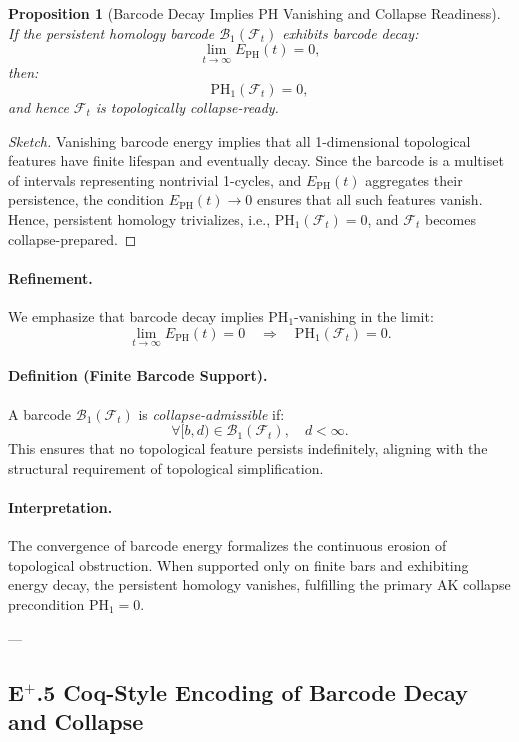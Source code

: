 \documentclass[11pt]{article}
\newtheorem{proposition}[theorem]{Proposition}
\begin{document}
\begin{proposition}[Barcode Decay Implies PH Vanishing and Collapse Readiness]
If the persistent homology barcode $\mathcal{B}_1(\mathcal{F}_t)$ exhibits barcode decay:
\[
\lim_{t \to \infty} E_{\mathrm{PH}}(t) = 0,
\]
then:
\[
\mathrm{PH}_1(\mathcal{F}_t) = 0,
\]
and hence $\mathcal{F}_t$ is topologically collapse-ready.
\end{proposition}

\begin{proof}[Sketch]
Vanishing barcode energy implies that all 1-dimensional topological features have finite lifespan and eventually decay. Since the barcode is a multiset of intervals representing nontrivial 1-cycles, and $E_{\mathrm{PH}}(t)$ aggregates their persistence, the condition $E_{\mathrm{PH}}(t) \to 0$ ensures that all such features vanish. Hence, persistent homology trivializes, i.e., $\mathrm{PH}_1(\mathcal{F}_t) = 0$, and $\mathcal{F}_t$ becomes collapse-prepared.
\end{proof}

\paragraph{Refinement.}
We emphasize that barcode decay implies PH$_1$-vanishing in the limit:
\[
\lim_{t \to \infty} E_{\mathrm{PH}}(t) = 0 \quad \Rightarrow \quad \mathrm{PH}_1(\mathcal{F}_t) = 0.
\]

\paragraph{Definition (Finite Barcode Support).}
A barcode $\mathcal{B}_1(\mathcal{F}_t)$ is \emph{collapse-admissible} if:
\[
\forall [b,d) \in \mathcal{B}_1(\mathcal{F}_t), \quad d < \infty.
\]
This ensures that no topological feature persists indefinitely, aligning with the structural requirement of topological simplification.

\paragraph{Interpretation.}
The convergence of barcode energy formalizes the continuous erosion of topological obstruction. When supported only on finite bars and exhibiting energy decay, the persistent homology vanishes, fulfilling the primary AK collapse precondition $\mathrm{PH}_1 = 0$.

---

\subsection*{E$^{+}$.5 Coq-Style Encoding of Barcode Decay and Collapse}
\end{document}
